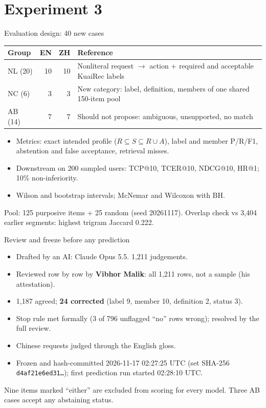 \documentclass[10pt]{beamer}
\newcommand{\toprule}{\hline}
\newcommand{\midrule}{\hline}
\newcommand{\bottomrule}{\hline}
\newcommand{\src}[1]{\vfill{\tiny\color{bcitgray}#1}}
\begin{document}
\section{Experiment 3}
\begin{frame}{Evaluation design: 40 new cases}
\small
\begin{tabular}{@{}P{1.4cm}rrP{6.0cm}@{}}
\toprule
Group & EN & ZH & Reference\\\midrule
NL (20) & 10 & 10 & Nonliteral request $\to$ action + required and acceptable KuaiRec labels\\[0.1cm]
NC (6) & 3 & 3 & New category: label, definition, members of one shared 150-item pool\\[0.1cm]
AB (14) & 7 & 7 & Should not propose: ambiguous, unsupported, no match\\\bottomrule
\end{tabular}\par
\vspace{0.2cm}
\begin{itemize}
\item Metrics: exact intended profile ($R\subseteq S\subseteq R\cup A$), label and member P/R/F1, abstention and false acceptance, retrieval misses.
\item Downstream on 200 sampled users: TCP@10, TCER@10, NDCG@10, HR@1; 10\% non-inferiority.
\item Wilson and bootstrap intervals; McNemar and Wilcoxon with BH.
\end{itemize}
\src{Pool: 125 purposive items + 25 random (seed 20261117). Overlap check vs 3,404 earlier segments: highest trigram Jaccard 0.222.}
\end{frame}

\begin{frame}{Review and freeze before any prediction}
\small
\begin{itemize}
\item Drafted by an AI: Claude Opus 5.5. 1,211 judgements.
\item Reviewed row by row by \textbf{Vibhor Malik}: all 1,211 rows, not a sample (his attestation).
\item 1,187 agreed; \textbf{24 corrected} (label 9, member 10, definition 2, status 3).
\item Stop rule met formally (3 of 796 unflagged ``no'' rows wrong); resolved by the full review.
\item Chinese requests judged through the English gloss.
\item Frozen and hash-committed 2026-11-17 02:27:25 UTC (set SHA-256 \texttt{d4af21e6ed31\ldots}); first prediction run started 02:28:10 UTC.
\end{itemize}
\src{Nine items marked ``either'' are excluded from scoring for every model. Three AB cases accept any abstaining status.}
\end{frame}
\end{document}
